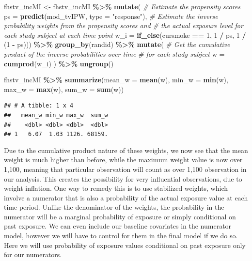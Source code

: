 \documentclass[
]{book}
\newenvironment{Shaded}{\begin{snugshade}}{\end{snugshade}}
\newcommand{\AttributeTok}[1]{\textcolor[rgb]{0.13,0.29,0.53}{#1}}
\newcommand{\CommentTok}[1]{\textcolor[rgb]{0.56,0.35,0.01}{\textit{#1}}}
\newcommand{\DecValTok}[1]{\textcolor[rgb]{0.00,0.00,0.81}{#1}}
\newcommand{\FunctionTok}[1]{\textcolor[rgb]{0.13,0.29,0.53}{\textbf{#1}}}
\newcommand{\NormalTok}[1]{#1}
\newcommand{\OtherTok}[1]{\textcolor[rgb]{0.56,0.35,0.01}{#1}}
\newcommand{\SpecialCharTok}[1]{\textcolor[rgb]{0.81,0.36,0.00}{\textbf{#1}}}
\newcommand{\StringTok}[1]{\textcolor[rgb]{0.31,0.60,0.02}{#1}}
\begin{document}
\begin{Shaded}
\begin{Highlighting}[]
\NormalTok{fhstv\_incMI }\OtherTok{\textless{}{-}}\NormalTok{ fhstv\_incMI }\SpecialCharTok{\%\textgreater{}\%}
  \FunctionTok{mutate}\NormalTok{(}
    \CommentTok{\# Estimate the propensity scores}
    \AttributeTok{ps =} \FunctionTok{predict}\NormalTok{(mod\_tvIPW, }\AttributeTok{type =} \StringTok{"response"}\NormalTok{), }
    \CommentTok{\# Estimate the inverse probability weights from the propensity scores and}
    \CommentTok{\# the actual exposure level for each study subject at each time point}
    \AttributeTok{w\_i =} \FunctionTok{if\_else}\NormalTok{(cursmoke }\SpecialCharTok{==} \DecValTok{1}\NormalTok{, }\DecValTok{1} \SpecialCharTok{/}\NormalTok{ ps, }\DecValTok{1} \SpecialCharTok{/}\NormalTok{ (}\DecValTok{1} \SpecialCharTok{{-}}\NormalTok{ ps))) }\SpecialCharTok{\%\textgreater{}\%} 
  \FunctionTok{group\_by}\NormalTok{(randid) }\SpecialCharTok{\%\textgreater{}\%}
  \FunctionTok{mutate}\NormalTok{(}
    \CommentTok{\# Get the cumulative product of the inverse probabilities over time}
    \CommentTok{\# for each study subject}
    \AttributeTok{w =} \FunctionTok{cumprod}\NormalTok{(w\_i)}
\NormalTok{  ) }\SpecialCharTok{\%\textgreater{}\%} 
  \FunctionTok{ungroup}\NormalTok{()}

\NormalTok{fhstv\_incMI }\SpecialCharTok{\%\textgreater{}\%}
  \FunctionTok{summarize}\NormalTok{(}\AttributeTok{mean\_w =} \FunctionTok{mean}\NormalTok{(w),}
            \AttributeTok{min\_w =} \FunctionTok{min}\NormalTok{(w),}
            \AttributeTok{max\_w =} \FunctionTok{max}\NormalTok{(w),}
            \AttributeTok{sum\_w =} \FunctionTok{sum}\NormalTok{(w))}
\end{Highlighting}
\end{Shaded}

\begin{verbatim}
## # A tibble: 1 x 4
##   mean_w min_w max_w  sum_w
##    <dbl> <dbl> <dbl>  <dbl>
## 1   6.07  1.03 1126. 68159.
\end{verbatim}

Due to the cumulative product nature of these weights, we now see that the mean weight is much higher than before, while the maximum weight value is now over 1,100, meaning that particular observation will count as over 1,100 observation in our analysis. This creates the possibility for very influential observations, due to weight inflation. One way to remedy this is to use stabilized weights, which involve a numerator that is also a probability of the actual exposure value at each time period. Unlike the denominator of the weights, the probability in the numerator will be a marginal probability of exposure or simply conditional on past exposure. We can even include our baseline covariates in the numerator model, however we will have to control for them in the final model if we do so. Here we will use probability of exposure values conditional on past exposure only for our numerators.
\end{document}
